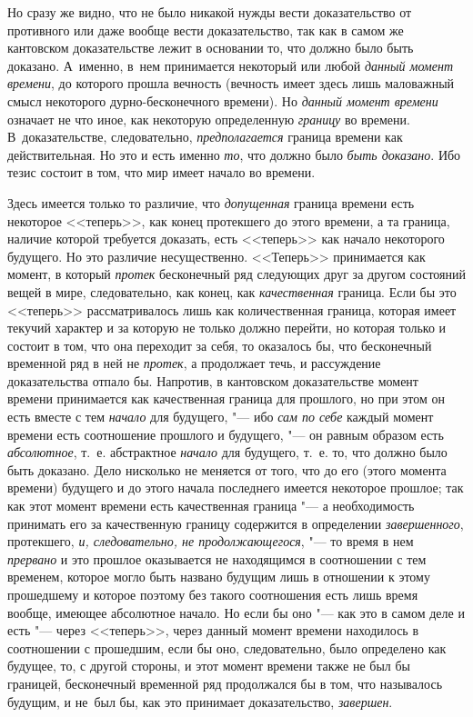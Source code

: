 Но сразу же видно, что не было никакой нужды вести доказательство от противного
или даже вообще вести доказательство, так как в самом же кантовском
доказательстве лежит в основании то, что должно было быть доказано. А~именно,
в~нем принимается некоторый или любой {\em данный момент времени}, до которого
прошла вечность (вечность имеет здесь лишь маловажный смысл некоторого
дурно-бесконечного времени). Но {\em данный момент времени} означает не что
иное, как некоторую определенную {\em границу} во времени. В~доказательстве,
следовательно, {\em предполагается} граница времени как действительная. Но это
и есть именно {\em то}, что должно было {\em быть доказано}. Ибо тезис состоит
в том, что мир имеет начало во времени.

Здесь имеется только то различие, что {\em допущенная} граница времени есть
некоторое <<теперь>>, как конец протекшего до этого времени, а та граница,
наличие которой требуется доказать, есть <<теперь>> как начало некоторого
будущего. Но это различие несущественно. <<Теперь>> принимается как момент,
в который {\em протек} бесконечный ряд следующих друг за другом состояний вещей
в мире, следовательно, как конец, как {\em качественная} граница. Если бы это
<<теперь>> рассматривалось лишь как количественная граница, которая имеет
текучий характер и за которую не только должно перейти, но которая только и
состоит в том, что она переходит за себя, то оказалось бы, что бесконечный
временной ряд в ней не {\em протек}, а продолжает течь, и рассуждение
доказательства отпало бы. Напротив, в кантовском доказательстве момент времени
принимается как качественная граница для прошлого, но при этом он есть вместе
с тем {\em начало} для будущего, "--- ибо {\em сам по себе} каждый момент
времени есть соотношение прошлого и будущего, "--- он равным образом есть
{\em абсолютное}, т.~е. абстрактное {\em начало} для будущего, т.~е. то, что
должно было быть доказано. Дело нисколько не меняется от того, что до его
(этого момента времени) будущего и до этого начала последнего имеется некоторое
прошлое; так как этот момент времени есть качественная граница "--- а
необходимость принимать его за качественную границу содержится в определении
{\em завершенного}, протекшего, {\em и, следовательно, не продолжающегося},
"--- то время в нем {\em прервано} и это прошлое оказывается не находящимся
в соотношении с тем временем, которое могло быть названо будущим лишь в отношении
к этому прошедшему и которое поэтому без такого соотношения есть лишь время
вообще, имеющее абсолютное начало. Но если бы оно "--- как это в самом деле
и есть "--- через <<теперь>>, через данный момент времени находилось
в соотношении с прошедшим, если бы оно, следовательно, было определено как
будущее, то, с другой стороны, и этот момент времени также не был бы границей,
бесконечный временной ряд продолжался бы в том, что называлось будущим, и
не~был бы, как это принимает доказательство, {\em завершен}.

